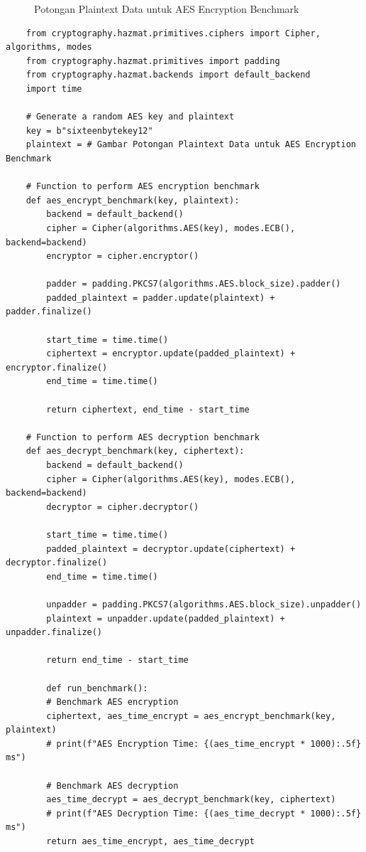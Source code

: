 \begin{figure}

    \caption{Potongan Plaintext Data untuk AES Encryption Benchmark}
    \label{fig:aesPlaintextData}
\end{figure}

\begin{verbatim}
    from cryptography.hazmat.primitives.ciphers import Cipher, algorithms, modes
    from cryptography.hazmat.primitives import padding
    from cryptography.hazmat.backends import default_backend
    import time

    # Generate a random AES key and plaintext
    key = b"sixteenbytekey12"
    plaintext = # Gambar Potongan Plaintext Data untuk AES Encryption Benchmark

    # Function to perform AES encryption benchmark
    def aes_encrypt_benchmark(key, plaintext):
        backend = default_backend()
        cipher = Cipher(algorithms.AES(key), modes.ECB(), backend=backend)
        encryptor = cipher.encryptor()

        padder = padding.PKCS7(algorithms.AES.block_size).padder()
        padded_plaintext = padder.update(plaintext) + padder.finalize()

        start_time = time.time()
        ciphertext = encryptor.update(padded_plaintext) + encryptor.finalize()
        end_time = time.time()

        return ciphertext, end_time - start_time

    # Function to perform AES decryption benchmark
    def aes_decrypt_benchmark(key, ciphertext):
        backend = default_backend()
        cipher = Cipher(algorithms.AES(key), modes.ECB(), backend=backend)
        decryptor = cipher.decryptor()

        start_time = time.time()
        padded_plaintext = decryptor.update(ciphertext) + decryptor.finalize()
        end_time = time.time()

        unpadder = padding.PKCS7(algorithms.AES.block_size).unpadder()
        plaintext = unpadder.update(padded_plaintext) + unpadder.finalize()

        return end_time - start_time
    
        def run_benchmark():
        # Benchmark AES encryption
        ciphertext, aes_time_encrypt = aes_encrypt_benchmark(key, plaintext)
        # print(f"AES Encryption Time: {(aes_time_encrypt * 1000):.5f} ms")

        # Benchmark AES decryption
        aes_time_decrypt = aes_decrypt_benchmark(key, ciphertext)
        # print(f"AES Decryption Time: {(aes_time_decrypt * 1000):.5f} ms")
        return aes_time_encrypt, aes_time_decrypt


\end{verbatim}
